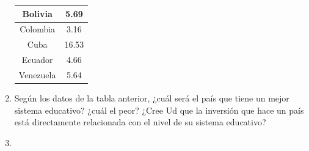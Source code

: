 \documentclass[10pt,twoside]{article}
\begin{document}
\begin{enumerate}
\begin{center}
\begin{tabular}{|c|c|}
\hline 
Bolivia & 5.69 \\ 
\hline 
Colombia & 3.16 \\ 
\hline 
Cuba & 16.53 \\ 
\hline 
Ecuador & 4.66 \\ 
\hline 
Venezuela & 5.64 \\ 
\hline 
\end{tabular}
\end{center}
\item Según los datos de la tabla anterior, ¿cuál será el país que tiene un mejor sistema educativo? ¿cuál el peor? ¿Cree Ud que la inversión que hace un país está directamente relacionada con el nivel de su sistema educativo?
\item 
\end{enumerate}
\end{document}
